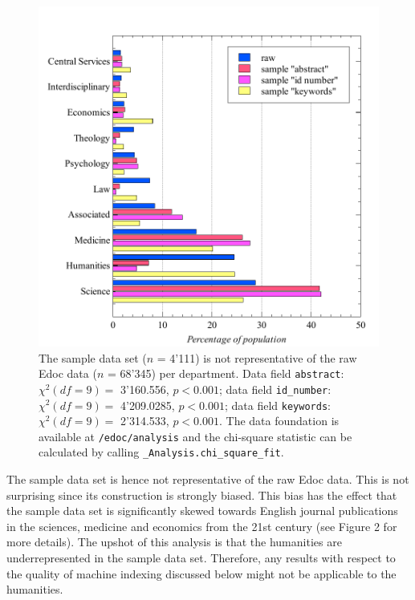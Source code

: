 \begin{figure}
\centering
\includegraphics{images/chi_square_selection_fields.pdf}
\caption{The sample data set (\(n\) = 4'111) is not representative of
the raw Edoc data (\(n\) = 68'345) per department. Data field
\texttt{abstract}: \(\chi^2 (df=9) =\) 3'160.556, \(p < 0.001\); data
field \texttt{id\_number}: \(\chi^2 (df=9) =\) 4'209.0285,
\(p < 0.001\); data field \texttt{keywords}: \(\chi^2 (df=9) =\)
2'314.533, \(p < 0.001\). The data foundation is available at
\texttt{/edoc/analysis} and the chi-square statistic can be calculated
by calling \texttt{\_Analysis.chi\_square\_fit}.}
\end{figure}

The sample data set is hence not representative of the raw Edoc data.
This is not surprising since its construction is strongly biased. This
bias has the effect that the sample data set is significantly skewed
towards English journal publications in the sciences, medicine and
economics from the 21st century (see Figure 2 for more details). The
upshot of this analysis is that the humanities are underrepresented in
the sample data set. Therefore, any results with respect to the quality
of machine indexing discussed below might not be applicable to the
humanities.

